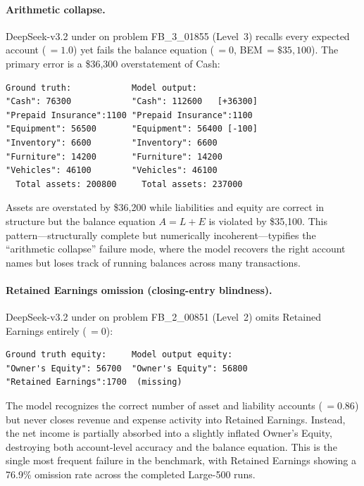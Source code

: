 \paragraph{Arithmetic collapse.}
DeepSeek-v3.2 under \zs{} on problem FB\_3\_01855 (Level~3) recalls
every expected account (\acr{}\,$=1.0$) yet fails the balance equation
(\ba{}\,$=0$, \textsc{BEM}\,$=\$35{,}100$).
The primary error is a \$36{,}300 overstatement of Cash:

\begin{small}
\begin{verbatim}
Ground truth:            Model output:
"Cash": 76300            "Cash": 112600   [+36300]
"Prepaid Insurance":1100 "Prepaid Insurance":1100
"Equipment": 56500       "Equipment": 56400 [-100]
"Inventory": 6600        "Inventory": 6600
"Furniture": 14200       "Furniture": 14200
"Vehicles": 46100        "Vehicles": 46100
  Total assets: 200800     Total assets: 237000
\end{verbatim}
\end{small}

\noindent
Assets are overstated by \$36{,}200 while liabilities and equity are
correct in structure but the balance equation
$A = L + E$ is violated by \$35{,}100.
This pattern---structurally complete but numerically
incoherent---typifies the ``arithmetic collapse'' failure mode, where
the model recovers the right account names but loses track of running
balances across many transactions.

\paragraph{Retained Earnings omission (closing-entry blindness).}
DeepSeek-v3.2 under \zs{} on problem FB\_2\_00851 (Level~2)
omits Retained Earnings entirely (\cecr{}\,$=0$):

\begin{small}
\begin{verbatim}
Ground truth equity:     Model output equity:
"Owner's Equity": 56700  "Owner's Equity": 56800
"Retained Earnings":1700  (missing)
\end{verbatim}
\end{small}

\noindent
The model recognizes the correct number of asset and liability
accounts (\acr{}\,$=0.86$) but never closes revenue and expense
activity into Retained Earnings.  Instead, the net income is
partially absorbed into a slightly inflated Owner's Equity, destroying
both account-level accuracy and the balance equation.  This is the
single most frequent failure in the benchmark, with Retained Earnings
showing a 76.9\% omission rate across the completed Large-500 runs.

